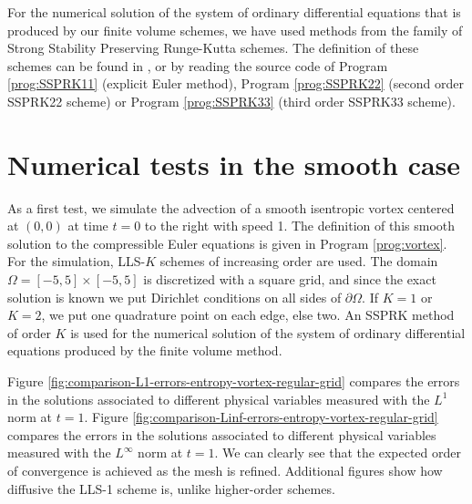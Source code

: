 

For the numerical solution of the system of ordinary differential
equations that is produced by our finite volume schemes, we have used
methods from the family of Strong Stability Preserving Runge-Kutta schemes.
The definition of these schemes can be found in \cite{gottlieb2011strong},
or by reading the source code of Program \ref{prog:SSPRK11} (explicit
Euler method), Program \ref{prog:SSPRK22} (second order SSPRK22 scheme)
or Program \ref{prog:SSPRK33} (third order SSPRK33 scheme).

\section{Numerical tests in the smooth case} \label{sec:numerical-tests-smooth}
As a first test, we simulate the advection of a smooth
isentropic vortex centered at $(0,0)$ at time $t = 0$
to the right with speed 1.
The definition of this smooth solution to the compressible
Euler equations is given in Program \ref{prog:vortex}.
For the simulation, LLS-$K$ schemes of increasing order are used.
The domain $\Omega = [-5,5] \times [-5,5]$ is discretized with
a square grid, and since the exact solution is known we put
Dirichlet conditions on all sides of $\partial\Omega$.
If $K = 1$ or $K = 2$, we put one quadrature point on each edge, else two.
An SSPRK method of order $K$ is used for the numerical solution
of the system of ordinary differential equations produced by the
finite volume method.

Figure \ref{fig:comparison-L1-errors-entropy-vortex-regular-grid}
compares the errors in the solutions associated to different physical variables
measured with the $L^1$ norm at $t = 1$.
Figure \ref{fig:comparison-Linf-errors-entropy-vortex-regular-grid}
compares the errors in the solutions associated to different physical variables
measured with the $L^\infty$ norm at $t = 1$.
We can clearly see that the expected order of convergence
is achieved as the mesh is refined. Additional figures show how diffusive
the LLS-1 scheme is, unlike higher-order schemes.

